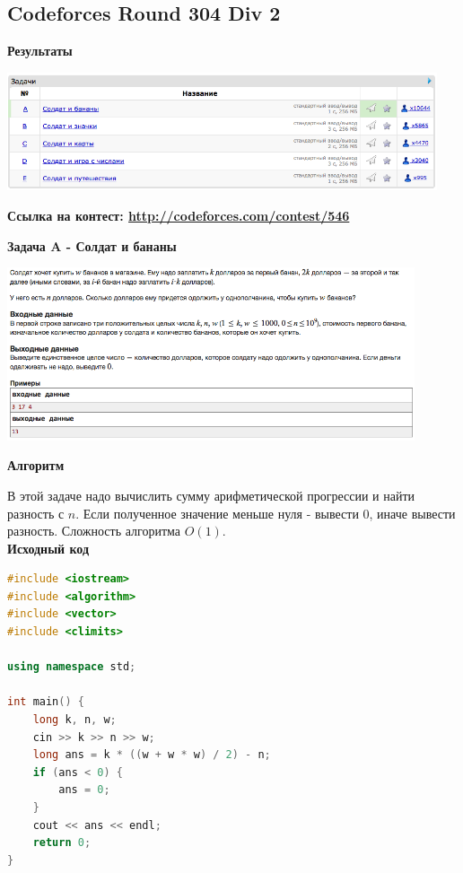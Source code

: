 \documentclass[a4paper,12pt]{article}
\begin{document}
%
%

\newpage
\subsection{Codeforces Round 304 Div 2}

\textbf{{\large Результаты}} \\
\begin{center}
\includegraphics[width=0.95\textwidth]{C_304/result.png}\\ [1cm]
\end{center}

\textbf{{\large Ссылка на контест: \url{http://codeforces.com/contest/546}}}

\newpage
\textbf{{\large Задача A - Солдат и бананы}}

\begin{center}
\includegraphics[width=0.9\textwidth]{C_304/A.png}\\ [1cm]
\end{center}

\textbf{{\large Алгоритм}}

В этой задаче надо вычислить сумму арифметической прогрессии и найти разность с $n$. Если полученное значение меньше нуля - вывести 0, иначе вывести разность. Сложность алгоритма $O(1)$.\\

\textbf{{\large Исходный код}} \\
\begin{lstlisting}[language=C++]
#include <iostream>
#include <algorithm>
#include <vector>
#include <climits>

using namespace std;

int main() {
    long k, n, w;
    cin >> k >> n >> w;
    long ans = k * ((w + w * w) / 2) - n;
    if (ans < 0) {
        ans = 0;
    }
    cout << ans << endl;
    return 0;
}\end{lstlisting}
\end{document}
